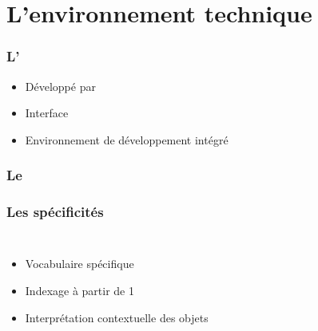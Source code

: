\section{L'environnement technique}

\begin{frame} 
    \frametitle{L' \windev}
    \itemstitle{\windev}
    \begin{itemize}
        \item<2> Développé par 
        \item<2> Interface 
        \item<2> Environnement de développement intégré
    \end{itemize}
\end{frame}

\begin{frame}[fragile]
    \frametitle{Le \wlang}
    \begin{sourcecode}
        
    \end{sourcecode}
\end{frame}

\begin{frame}[fragile] 
    \frametitle{Les spécificités}
    \begin{columns}
        \begin{itemize}
            \item<2-> \alert<2>{Vocabulaire spécifique}
            \item<3-> \alert<3>{Indexage à partir de 1}
            \item<4-> \alert<4>{Interprétation contextuelle des objets}
        \end{itemize}

    \end{columns}
\end{frame}